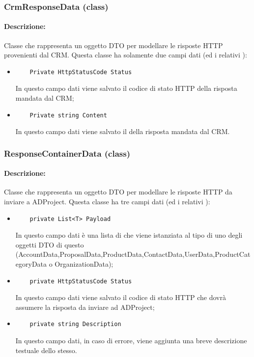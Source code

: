 \subsubsection{CrmResponseData (class)}
\paragraph{Descrizione:}
Classe che rappresenta un oggetto DTO per modellare le risposte HTTP provenienti dal CRM.
Questa classe ha solamente due campi dati (ed i relativi ):
\begin{itemize}
	\item 	
	\begin{lstlisting}
	Private HttpStatusCode Status
	\end{lstlisting}
	In questo campo dati viene salvato il codice di stato HTTP della risposta mandata dal CRM;
	\item
	\begin{lstlisting}
	Private string Content
	\end{lstlisting}
	In questo campo dati viene salvato il  della risposta mandata dal CRM.
\end{itemize}

\subsubsection{ResponseContainerData (class)}
\paragraph{Descrizione:}
Classe che rappresenta un oggetto DTO per modellare le risposte HTTP da inviare a ADProject.
Questa classe ha tre campi dati (ed i relativi ):
\begin{itemize}
	\item 	
	\begin{lstlisting}
	private List<T> Payload
	\end{lstlisting}
	In questo campo dati è una lista di  che viene istanziata al tipo di uno degli oggetti DTO di questo  (AccountData,ProposalData,ProductData,ContactData,UserData,ProductCategoryData o OrganizationData);
	
	\item 	
	\begin{lstlisting}
	private HttpStatusCode Status
	\end{lstlisting}
	In questo campo dati viene salvato il codice di stato HTTP che dovrà assumere la risposta da inviare ad ADProject;
	
	\item
	\begin{lstlisting}
	private string Description
	\end{lstlisting}
	In questo campo dati, in caso di errore, viene aggiunta una breve descrizione testuale dello stesso.
\end{itemize}




